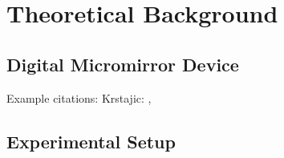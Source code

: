 

\chapter{Theoretical Background}
\section{Digital Micromirror Device} %
\label{sec:digital_micromirror_device}
Example citations: Krstajic: \cite{krstajic}, \cite{bartlett}

\section{Experimental Setup} %
\label{sec:experimental_setup}

